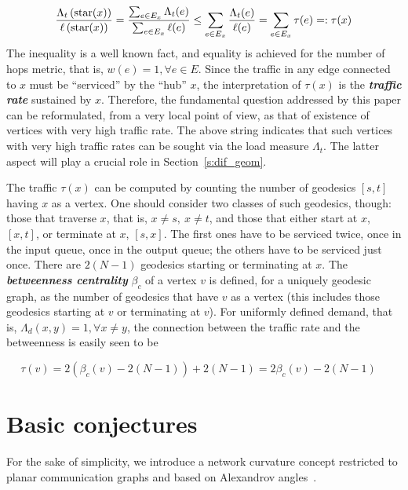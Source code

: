 \documentclass{article}
\begin{document}
\noindent 

\[\frac{\Lambda _{t} \left({\rm star}(x)\right)}{\ell \left({\rm star}(x)\right)} =\frac{\sum _{e\in E_x}\Lambda _{t} (e) }{\sum _{e\in E_x}\ell (e) } \le \sum _{e\in E_x}\frac{\Lambda _{t} (e)}{\ell (e)}  =\sum _{e\in E_x}\tau (e)= :\tau (x)\] 
The inequality is a well known fact, and equality is achieved for the number of hops metric, that is, $w(e)=1,\forall e\in E$. Since the traffic in any edge connected to $x$ must be ``serviced'' by the ``hub'' $x$, the interpretation of $\tau (x)$ is the \textit{\textbf{traffic rate}} sustained by $x$. Therefore, the fundamental question addressed by this paper can be reformulated, from a very local point of view, as that of existence of vertices with very high traffic rate. The above string indicates that such vertices with very high traffic rates can be sought via the load measure $\Lambda_t$. 
The latter aspect will play a crucial role in Section~\ref{s:dif_geom}. 
 

The traffic $\tau (x)$ can be computed by counting the number of geodesics $\left[s,t\right]$ having $x$ as a vertex. One should consider two classes of such geodesics, though: those that traverse $x$, that is, $x\ne s,\:x\ne t$, and those that either start at $x$, $\left[x,t\right]$, or terminate at $x$, $[s,x]$. The first ones have to be serviced twice, once in the input queue, once in the output queue; the others have to be serviced just once. There are $2(N-1)$ geodesics starting or terminating at $x$. The \textit{\textbf{betweenness centrality}} $\beta_c$ of a vertex $v$ is defined, for a uniquely geodesic graph, as the number of geodesics that have $v$ as a vertex (this includes those geodesics starting at $v$ or terminating at $v$). For uniformly defined demand, that is, $\Lambda _{d} (x,y)=1,\forall x\ne y$, the connection between the traffic rate and the betweenness is easily seen to be

\noindent 

\[\tau (v)=2(\beta_c (v)-2(N-1))+2(N-1)=2\beta_c (v)-2(N-1)\quad \] 


\noindent 
\section{Basic conjectures}
\label{s:basic_conjectures}

For the sake of simplicity, 
we introduce a network curvature concept restricted to planar communication graphs 
and based on Alexandrov angles~\cite{BridsonHaefliger1999}. 
\end{document}
